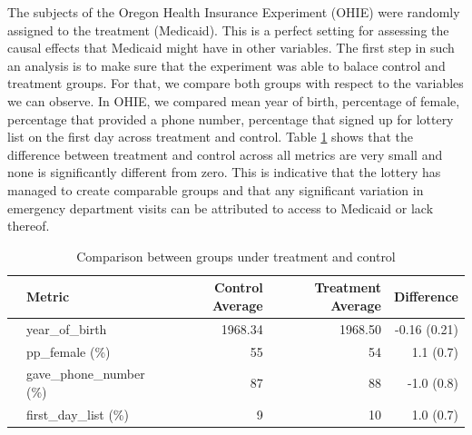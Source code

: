 The subjects of the Oregon Health Insurance Experiment (OHIE) were randomly assigned to the treatment (Medicaid). This is a perfect setting for assessing the causal effects that Medicaid might have in other variables. The first step in such an analysis is to make sure that the experiment was able to balace control and treatment groups. For that, we compare both groups with respect to the variables we can observe.  In OHIE, we compared mean year of birth, percentage of female, percentage that provided a phone number, percentage that signed up for lottery list on the first day across treatment and control. Table \ref{tab:treatment_control_comparison} shows that the difference between treatment and control across all metrics are very small and none is significantly different from zero. This is indicative that the lottery has managed to create comparable groups and that any significant variation in emergency department visits can be attributed to access to Medicaid or lack thereof.

\begin{table}[ht]
\centering
\begin{tabular}{rlrrr}
  \hline
    & Metric & Control Average & Treatment Average &  Difference \\ 
  \hline
   & year\_of\_birth          & 1968.34 & 1968.50 &  -0.16 (0.21)\\ 
   & pp\_female (\%)          & 55    & 54        &  1.1 (0.7) \\ 
   & gave\_phone\_number (\%) & 87    & 88        &  -1.0 (0.8) \\ 
   & first\_day\_list (\%)    & 9     & 10        &  1.0  (0.7)\\ 
   \hline
\end{tabular}
   \caption{\label{tab:treatment_control_comparison} Comparison between groups under treatment and control}
\end{table}

\newpage

